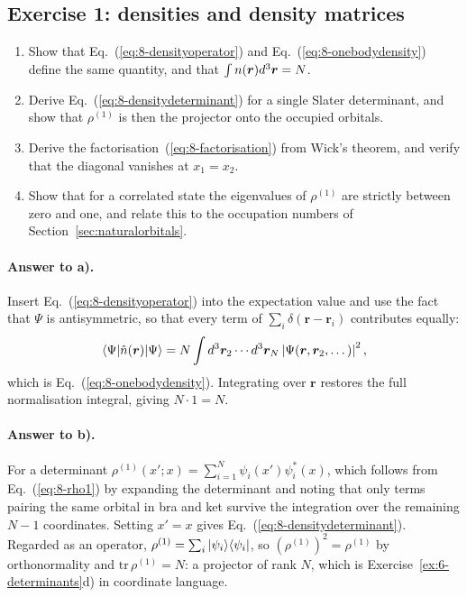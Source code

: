\subsection*{Exercise 1: densities and density matrices}
\label{ex:8-densities}

\begin{enumerate}
  \item[a)] Show that Eq.~(\ref{eq:8-densityoperator}) and
  Eq.~(\ref{eq:8-onebodydensity}) define the same quantity, and that
  $\int n(\bm{r})d^3\bm{r}=N$.
  \item[b)] Derive Eq.~(\ref{eq:8-densitydeterminant}) for a single Slater
  determinant, and show that $\rho^{(1)}$ is then the projector onto the
  occupied orbitals.
  \item[c)] Derive the factorisation~(\ref{eq:8-factorisation}) from Wick's
  theorem, and verify that the diagonal vanishes at $x_1=x_2$.
  \item[d)] Show that for a correlated state the eigenvalues of
  $\rho^{(1)}$ are strictly between zero and one, and relate this to the
  occupation numbers of Section~\ref{sec:naturalorbitals}.
\end{enumerate}

\paragraph{Answer to a).}
Insert Eq.~(\ref{eq:8-densityoperator}) into the expectation value and use the
fact that $\Psi$ is antisymmetric, so that every term of
$\sum_i\delta(\bm{r}-\bm{r}_i)$ contributes equally:
\begin{equation}
  \langle \Psi | \hat{n}(\bm{r}) | \Psi \rangle
   = N\int d^3\bm{r}_2\cdots d^3\bm{r}_N
     \left\vert\Psi(\bm{r},\bm{r}_2,\dots)\right\vert^2 ,
  \label{eq:8-exa1}
\end{equation}
which is Eq.~(\ref{eq:8-onebodydensity}).  Integrating over $\bm{r}$ restores
the full normalisation integral, giving $N\cdot1=N$.

\paragraph{Answer to b).}
For a determinant $\rho^{(1)}(x';x)=\sum_{i=1}^{N}\psi_i(x')\psi_i^{*}(x)$,
which follows from Eq.~(\ref{eq:8-rho1}) by expanding the determinant and
noting that only terms pairing the same orbital in bra and ket survive the
integration over the remaining $N-1$ coordinates.  Setting $x'=x$ gives
Eq.~(\ref{eq:8-densitydeterminant}).  Regarded as an operator,
$\rho^{(1)}=\sum_i\vert \psi_i \rangle\langle \psi_i \vert$, so $(\rho^{(1)})^2=\rho^{(1)}$
by orthonormality and $\mathrm{tr}\,\rho^{(1)}=N$: a projector of rank $N$,
which is Exercise~\ref{ex:6-determinants}d) in coordinate language.

